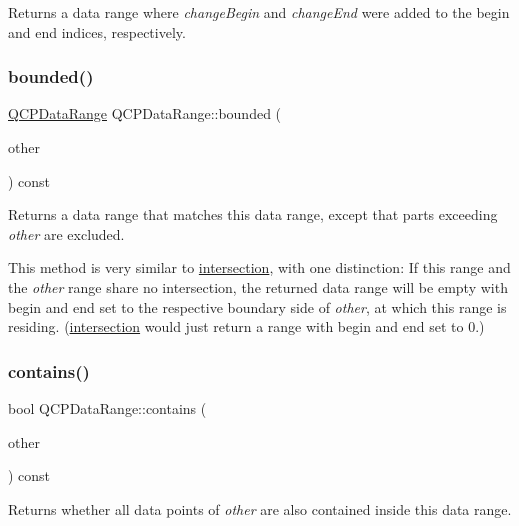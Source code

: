 Returns a data range where {\itshape change\+Begin} and {\itshape change\+End} were added to the begin and end indices, respectively. \mbox{\label{classQCPDataRange_a93529421d12fdd3a8bdb2b8061936352}} 
\subsubsection{\texorpdfstring{bounded()}{bounded()}}
{\footnotesize\ttfamily \hyperlink{classQCPDataRange}{Q\+C\+P\+Data\+Range} Q\+C\+P\+Data\+Range\+::bounded (\begin{DoxyParamCaption}\item[{const \hyperlink{classQCPDataRange}{Q\+C\+P\+Data\+Range} \&}]{other }\end{DoxyParamCaption}) const}

Returns a data range that matches this data range, except that parts exceeding {\itshape other} are excluded.

This method is very similar to \hyperlink{classQCPDataRange_a84e1e03129dd52528efb4bac18d30183}{intersection}, with one distinction\+: If this range and the {\itshape other} range share no intersection, the returned data range will be empty with begin and end set to the respective boundary side of {\itshape other}, at which this range is residing. (\hyperlink{classQCPDataRange_a84e1e03129dd52528efb4bac18d30183}{intersection} would just return a range with begin and end set to 0.) \mbox{\label{classQCPDataRange_a13ca398776374a3160aa85433718b812}} 
\subsubsection{\texorpdfstring{contains()}{contains()}}
{\footnotesize\ttfamily bool Q\+C\+P\+Data\+Range\+::contains (\begin{DoxyParamCaption}\item[{const \hyperlink{classQCPDataRange}{Q\+C\+P\+Data\+Range} \&}]{other }\end{DoxyParamCaption}) const}

Returns whether all data points of {\itshape other} are also contained inside this data range.

